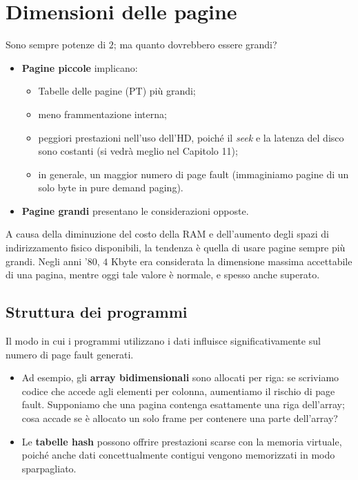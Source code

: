 \section{Dimensioni delle pagine}
Sono sempre potenze di $2$; ma quanto dovrebbero essere grandi? 

\begin{itemize}
    \item \textbf{Pagine piccole} implicano:
    \begin{itemize}
        \item Tabelle delle pagine (PT) più grandi;
        \item meno frammentazione interna;
        \item peggiori prestazioni nell’uso dell'HD, poiché il \textit{seek} e la latenza del disco sono costanti (si vedrà meglio nel Capitolo 11);
        \item in generale, un maggior numero di page fault (immaginiamo pagine di un solo byte in pure demand paging).
    \end{itemize}
    
    \item \textbf{Pagine grandi} presentano le considerazioni opposte.
\end{itemize}

A causa della diminuzione del costo della RAM e dell’aumento degli spazi di indirizzamento fisico disponibili, la tendenza è quella di usare pagine sempre più grandi. Negli anni ’80, $4$ Kbyte era considerata la dimensione massima accettabile di una pagina, mentre oggi tale valore è normale, e spesso anche superato. 


\subsection{Struttura dei programmi}
Il modo in cui i programmi utilizzano i dati influisce significativamente sul numero di page fault generati.

\begin{itemize}
    \item Ad esempio, gli \textbf{array bidimensionali} sono allocati per riga: se scriviamo codice che accede agli elementi per colonna, aumentiamo il rischio di page fault. Supponiamo che una pagina contenga esattamente una riga dell'array; cosa accade se è allocato un solo frame per contenere una parte dell’array?

    \item Le \textbf{tabelle hash} possono offrire prestazioni scarse con la memoria virtuale, poiché anche dati concettualmente contigui vengono memorizzati in modo sparpagliato.
\end{itemize}

